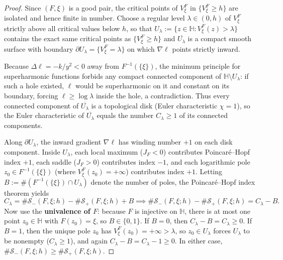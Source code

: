 \documentclass[12pt]{article}
\def\H{\mathbb{H}}
\def\S{\mathcal{S}}
\theoremstyle{definition}
\numberwithin{equation}{section}
\begin{document}
\begin{proof}
Since $(F, \xi)$ is a good pair, the critical points of $V_\xi^F$ in $\{V_\xi^F \ge h\}$ are isolated and hence finite in number. Choose a regular level $\lambda \in (0, h)$ of $V_\xi^F$ strictly above all critical values below $h$, so that $U_\lambda := \{z \in \H : V_\xi^F(z) > \lambda\}$ contains the exact same critical points as $\{V_\xi^F \ge h\}$ and $\overline{U_\lambda}$ is a compact smooth surface with boundary $\partial U_\lambda = \{V_\xi^F = \lambda\}$ on which $\nabla \ell$ points strictly inward.

Because $\Delta \ell = -k/y^2 < 0$ away from $F^{-1}(\{\xi\})$, the minimum principle for superharmonic functions forbids any compact connected component of $\H \setminus U_\lambda$: if such a hole existed, $\ell$ would be superharmonic on it and constant on its boundary, forcing $\ell \ge \log \lambda$ inside the hole, a contradiction. Thus every connected component of $\overline{U_\lambda}$ is a topological disk (Euler characteristic $\chi = 1$), so the Euler characteristic of $\overline{U_\lambda}$ equals the number $C_\lambda \ge 1$ of its connected components.

Along $\partial U_\lambda$, the inward gradient $\nabla \ell$ has winding number $+1$ on each disk component. Inside $U_\lambda$, each local maximum ($J_F < 0$) contributes Poincar\'e--Hopf index $+1$, each saddle ($J_F > 0$) contributes index $-1$, and each logarithmic pole $z_0 \in F^{-1}(\{\xi\})$ (where $V_\xi^F(z_0) = +\infty$) contributes index $+1$. Letting $B := \#(F^{-1}(\{\xi\}) \cap U_\lambda)$ denote the number of poles, the Poincar\'e--Hopf index theorem yields
\begin{equation}\label{eq:poincare-hopf-balance}
  C_\lambda = \# \S_-(F, \xi; h) - \# \S_+(F, \xi; h) + B \implies \# \S_-(F, \xi; h) - \# \S_+(F, \xi; h) = C_\lambda - B.
\end{equation}
Now use the \textbf{univalence of $F$}: because $F$ is injective on $\H$, there is at most one point $z_0 \in \H$ with $F(z_0) = \xi$, so $B \in \{0, 1\}$. If $B = 0$, then $C_\lambda - B = C_\lambda \ge 0$. If $B = 1$, then the unique pole $z_0$ has $V_\xi^F(z_0) = +\infty > \lambda$, so $z_0 \in U_\lambda$ forces $U_\lambda$ to be nonempty ($C_\lambda \ge 1$), and again $C_\lambda - B = C_\lambda - 1 \ge 0$. In either case, $\#\S_-(F, \xi; h) \ge \#\S_+(F, \xi; h)$.
\end{proof}
\end{document}
